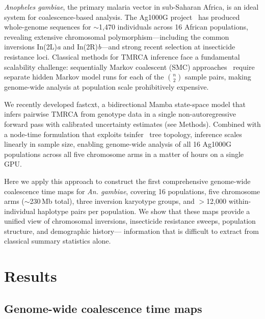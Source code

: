 \documentclass[10pt]{article}
\begin{document}
\textit{Anopheles gambiae}, the primary malaria vector in sub-Saharan Africa,
is an ideal system for coalescence-based analysis. The Ag1000G
project~\citep{ag1000g2017genetic, ag1000g2020genome} has produced
whole-genome sequences for $\sim$1{,}470 individuals across 16 African
populations, revealing extensive chromosomal polymorphism---including the
common inversions In(2L)\textit{a} and In(2R)\textit{b}---and strong recent
selection at insecticide resistance loci. Classical methods for TMRCA
inference face a fundamental scalability challenge: sequentially Markov
coalescent (SMC) approaches~\citep{li2011inference, terhorst2017robust}
require separate hidden Markov model runs for each of the $\binom{n}{2}$
sample pairs, making genome-wide analysis at population scale prohibitively
expensive.

We recently developed fastcxt, a bidirectional Mamba state-space model that
infers pairwise TMRCA from genotype data in a single non-autoregressive
forward pass with calibrated uncertainty estimates (see Methods). Combined
with a node-time formulation that exploits tsinfer~\citep{kelleher2019inferring}
tree topology, inference scales linearly in sample size, enabling genome-wide
analysis of all 16 Ag1000G populations across all five chromosome arms in a
matter of hours on a single GPU.

Here we apply this approach to construct the first comprehensive genome-wide
coalescence time maps for \textit{An. gambiae}, covering 16 populations,
five chromosome arms ($\sim$230\,Mb total), three inversion karyotype groups,
and $>$12{,}000 within-individual haplotype pairs per population. We show
that these maps provide a unified view of chromosomal inversions, insecticide
resistance sweeps, population structure, and demographic history---
information that is difficult to extract from classical summary statistics
alone.


\section*{Results}

\subsection*{Genome-wide coalescence time maps}
\end{document}
